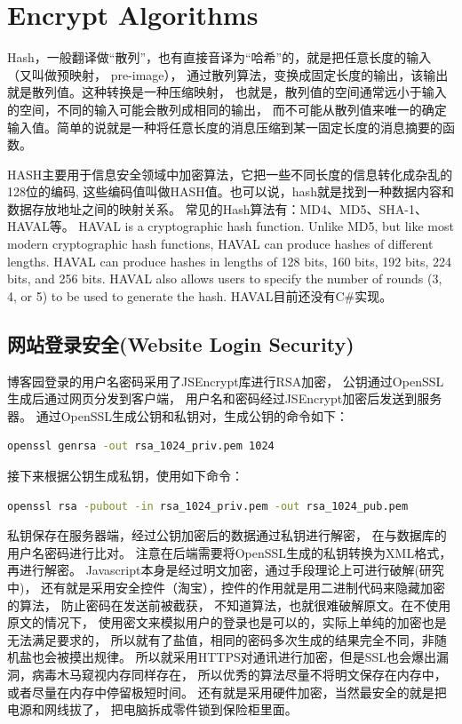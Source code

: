 \documentclass{book}
\begin{document}
\section{Encrypt Algorithms}

Hash，一般翻译做“散列”，也有直接音译为“哈希”的，就是把任意长度的输入（又叫做预映射， pre-image），
通过散列算法，变换成固定长度的输出，该输出就是散列值。这种转换是一种压缩映射，
也就是，散列值的空间通常远小于输入的空间，不同的输入可能会散列成相同的输出，
而不可能从散列值来唯一的确定输入值。简单的说就是一种将任意长度的消息压缩到某一固定长度的消息摘要的函数。

HASH主要用于信息安全领域中加密算法，它把一些不同长度的信息转化成杂乱的128位的编码,
这些编码值叫做HASH值。也可以说，hash就是找到一种数据内容和数据存放地址之间的映射关系。
常见的Hash算法有：MD4、MD5、SHA-1、HAVAL等。
HAVAL is a cryptographic hash function. 
Unlike MD5, but like most modern cryptographic hash functions, 
HAVAL can produce hashes of different lengths. 
HAVAL can produce hashes in lengths of 128 bits, 160 bits, 192 bits, 224 bits, and 256 bits. 
HAVAL also allows users to specify the number of rounds (3, 4, or 5) to be used to generate the hash.
HAVAL目前还没有C\#实现。

\subsection{网站登录安全(Website Login Security)}

博客园登录的用户名密码采用了JSEncrypt库进行RSA加密，
公钥通过OpenSSL生成后通过网页分发到客户端，
用户名和密码经过JSEncrypt加密后发送到服务器。
通过OpenSSL生成公钥和私钥对，生成公钥的命令如下：

\begin{lstlisting}[language=Bash]
openssl genrsa -out rsa_1024_priv.pem 1024
\end{lstlisting}

接下来根据公钥生成私钥，使用如下命令：

\begin{lstlisting}[language=Bash]
openssl rsa -pubout -in rsa_1024_priv.pem -out rsa_1024_pub.pem
\end{lstlisting}

私钥保存在服务器端，经过公钥加密后的数据通过私钥进行解密，
在与数据库的用户名密码进行比对。
注意在后端需要将OpenSSL生成的私钥转换为XML格式，再进行解密。
Javascript本身是经过明文加密，通过手段理论上可进行破解(研究中)，
还有就是采用安全控件（淘宝），控件的作用就是用二进制代码来隐藏加密的算法，
防止密码在发送前被截获，
不知道算法，也就很难破解原文。在不使用原文的情况下，
使用密文来模拟用户的登录也是可以的，实际上单纯的加密也是无法满足要求的，
所以就有了盐值，相同的密码多次生成的结果完全不同，非随机盐也会被摸出规律。
所以就采用HTTPS对通讯进行加密，但是SSL也会爆出漏洞，病毒木马窥视内存同样存在，
所以优秀的算法尽量不将明文保存在内存中，或者尽量在内存中停留极短时间。
还有就是采用硬件加密，当然最安全的就是把电源和网线拔了，
把电脑拆成零件锁到保险柜里面。
\end{document}
